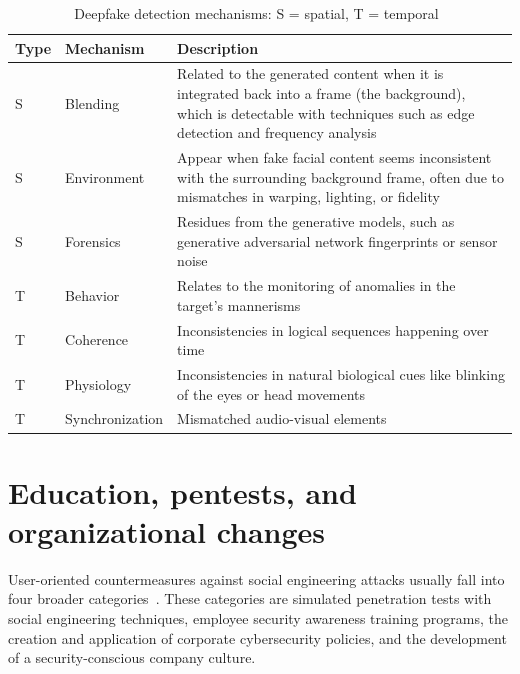 \begin{table}[ht!]  
\centering
\renewcommand{\arraystretch}{1.5} %
\setlength{\tabcolsep}{5pt} %
\begin{tabularx}{\textwidth}{|l|l|X|} %
\hline  
\textbf{Type} & \textbf{Mechanism} & \textbf{Description} \\ \hline  
S & Blending & Related to the generated content when it is integrated back into a frame (the background), which is detectable with techniques such as edge detection and frequency analysis \\ \hline  
S & Environment & Appear when fake facial content seems inconsistent
with the surrounding background frame, often due to mismatches in warping, lighting, or
fidelity \\ \hline  
S & Forensics & Residues from the generative models, such as generative
adversarial network fingerprints or sensor noise \\ \hline  
T & Behavior & Relates to the monitoring of anomalies in the target’s mannerisms \\ \hline  
T & Coherence & Inconsistencies in logical sequences
happening over time\\ \hline  
T & Physiology & Inconsistencies in natural biological cues like blinking of
the eyes or head movements \\ \hline  
T & Synchronization & Mismatched
audio-visual elements \\ \hline  
\end{tabularx}  
\caption{Deepfake detection mechanisms: S = spatial, T = temporal~\citep{mirsky_Creation_Detection_Deepfakes_2021}}  
\label{table:deepfake_artifacts}  
\end{table}  




\section{Education, pentests, and organizational changes}

User-oriented countermeasures against social engineering attacks usually fall into four broader categories~\citep{tsinganos_Towards_Automated_Recognition_Chat_SE_Enterprise_2018, mitnick_The_Art_of_Deception_2003}. These categories are simulated penetration tests with social engineering techniques, employee security awareness training programs, the creation and application of corporate cybersecurity policies, and the development of a security-conscious company culture.

